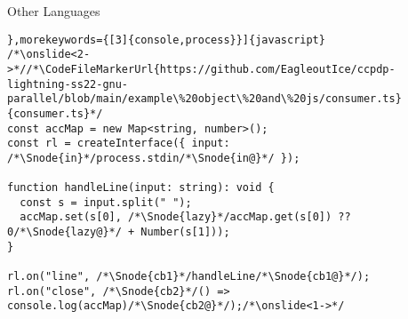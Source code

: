 {\begin{frame}[fragile]{Other Languages}
\begin{layout-imageonly}
\vspace*{-1.33\baselineskip} %
   \begin{verbatim}},morekeywords={[3]{console,process}}]{javascript}
/*\onslide<2->*//*\CodeFileMarkerUrl{https://github.com/EagleoutIce/ccpdp-lightning-ss22-gnu-parallel/blob/main/example\%20object\%20and\%20js/consumer.ts}{consumer.ts}*/
const accMap = new Map<string, number>();
const rl = createInterface({ input: /*\Snode{in}*/process.stdin/*\Snode{in@}*/ });

function handleLine(input: string): void {
  const s = input.split(" ");
  accMap.set(s[0], /*\Snode{lazy}*/accMap.get(s[0]) ?? 0/*\Snode{lazy@}*/ + Number(s[1]));
}

rl.on("line", /*\Snode{cb1}*/handleLine/*\Snode{cb1@}*/);
rl.on("close", /*\Snode{cb2}*/() => console.log(accMap)/*\Snode{cb2@}*/);/*\onslide<1->*/
   \end{verbatim}
\end{layout-imageonly}
\end{frame}
\SidebarReset

{

}}
